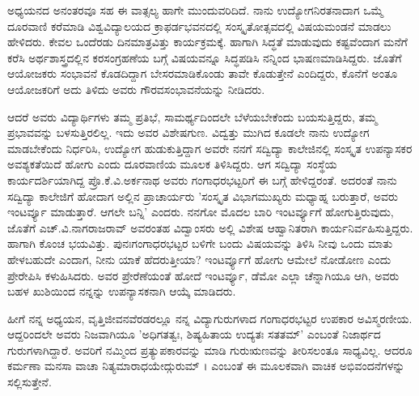 ಅಧ್ಯಯನದ ಅನಂತರವೂ ಸಹ ಈ ವಾತ್ಸಲ್ಯ ಹಾಗೇ ಮುಂದುವರಿದಿದೆ. ನಾನು ಉದ್ಯೋಗನಿರತನಾದಾಗ ಒಮ್ಮೆ ದೂರವಾಣಿ ಕರೆಮಾಡಿ ವಿಶ್ವವಿದ್ಯಾಲಯದ ಕ್ರಾಫರ್ಡಭವನದಲ್ಲಿ ಸಂಸ್ಕೃತೋತ್ಸವದಲ್ಲಿ ವಿಷಯಮಂಡನೆ ಮಾಡಲು ಹೇಳಿದರು. ಕೇವಲ ಒಂದೆರಡು ದಿನಮಾತ್ರವಿತ್ತು ಕಾರ್ಯಕ್ರಮಕ್ಕೆ. ಹಾಗಾಗಿ ಸಿದ್ಧತೆ ಮಾಡುವುದು ಕಷ್ಟವೆಂದಾಗ ಮನೆಗೆ ಕರೆಸಿ ಅರ್ಥಶಾಸ್ತ್ರದಲ್ಲಿನ ಕರಸಂಗ್ರಹಣೆಯ ಬಗ್ಗೆ ವಿಷಯವನ್ನೂ ಸಿದ್ಧಪಡಿಸಿ ನನ್ನಿಂದ ಭಾಷಣಮಾಡಿಸಿದ್ದರು. ಜೊತೆಗೆ ಆಯೋಜಕರು ಸಂಭಾವನೆ ಕೊಡದಿದ್ದಾಗ ಬೇಸರಮಾಡಿಕೊಂಡು ತಾವೇ ಕೊಡುತ್ತೇನೆ ಎಂದಿದ್ದರು, ಕೊನೆಗೆ ಅಂತೂ ಆಯೋಜಕರಿಗೆ ಅದು ತಿಳಿದು ಅವರು ಗೌರವಸಂಭಾವನೆಯನ್ನು ನೀಡಿದರು.

ಆದರೆ ಅವರು ವಿದ್ಯಾರ್ಥಿಗಳು ತಮ್ಮ ಪ್ರತಿಭೆ, ಸಾಮರ್ಥ್ಯದಿಂದಲೇ ಬೆಳೆಯಬೇಕೆಂದು ಬಯಸುತ್ತಿದ್ದರು, ತಮ್ಮ ಪ್ರಭಾವವನ್ನು ಬಳಸುತ್ತಿರಲಿಲ್ಲ. ಇದು ಅವರ ವಿಶೇಷಗುಣ. ವಿದ್ವತ್ತು ಮುಗಿದ ಕೂಡಲೇ ನಾನು ಉದ್ಯೋಗ ಮಾಡಬೇಕೆಂದು ನಿರ್ಧರಿಸಿ, ಉದ್ಯೋಗ ಹುಡುಕುತ್ತಿದ್ದಾಗ ಅವರೇ ನನಗೆ ಸದ್ವಿದ್ಯಾ ಕಾಲೇಜಿನಲ್ಲಿ ಸಂಸ್ಕೃತ ಉಪನ್ಯಾಸಕರ ಅವಶ್ಯಕತೆಯಿದೆ ಹೋಗು ಎಂದು ದೂರವಾಣಿಯ ಮೂಲಕ ತಿಳಿಸಿದ್ದರು. ಆಗ ಸದ್ವಿದ್ಯಾ ಸಂಸ್ಥೆಯ ಕಾರ್ಯದರ್ಶಿಯಾಗಿದ್ದ ಪ್ರೊ.ಕೆ.ವಿ.ಅರ್ಕನಾಥ ಅವರು ಗಂಗಾಧರಭಟ್ಟರಿಗೆ ಈ ಬಗ್ಗೆ ಹೇಳಿದ್ದರಂತೆ. ಅದರಂತೆ ನಾನು ಸದ್ವಿದ್ಯಾ ಕಾಲೇಜಿಗೆ ಹೋದಾಗ ಅಲ್ಲಿನ ಪ್ರಾಚಾರ್ಯರು ’ಸಂಸ್ಕೃತ ವಿಭಾಗಮುಖ್ಯರು ಮಧ್ಯಾಹ್ನ ಬರುತ್ತಾರೆ, ಅವರು ಇಂಟರ್ವ್ಯೂ ಮಾಡುತ್ತಾರೆ. ಆಗಲೇ ಬನ್ನಿ’ ಎಂದರು. ನನಗೋ ಮೊದಲ ಬಾರಿ ಇಂಟರ್ವ್ಯೂಗೆ ಹೋಗುತ್ತಿರುವುದು, ಜೊತೆಗೆ ಎಚ್.ವಿ.ನಾಗರಾಜರಾವ್ ಅವರಂತಹ ವಿದ್ವಾಂಸರು ಅಲ್ಲಿ ವಿಶೇಷ ಆಹ್ವಾನಿತರಾಗಿ ಕಾರ್ಯನಿರ್ವಹಿಸುತ್ತಿದ್ದರು. ಹಾಗಾಗಿ ಕೊಂಚ ಭಯವಿತ್ತು. ಪುನಃಗಂಗಾಧರಭಟ್ಟರ ಬಳಿಗೇ ಬಂದು ವಿಷಯವನ್ನು ತಿಳಿಸಿ ನೀವು ಒಂದು ಮಾತು ಹೇಳಬಹುದೇ ಎಂದಾಗ, ನೀನು ಯಾಕೆ ಹೆದರುತ್ತೀಯಾ? ಇಂಟರ್ವ್ಯೂಗೆ ಹೋಗು ಆಮೇಲೆ ನೋಡೋಣ ಎಂದು ಪ್ರೇರೇಪಿಸಿ ಕಳುಹಿಸಿದರು. ಅವರ ಪ್ರೇರೆಣೆಯಂತೆ ಹೋದೆ ಇಂಟರ್ವ್ಯೂ, ಡೆಮೋ ಎಲ್ಲಾ ಚೆನ್ನಾಗಿಯೂ ಆಗಿ, ಅವರು ಬಹಳ ಖುಶಿಯಿಂದ ನನ್ನನ್ನು ಉಪನ್ಯಾಸಕನಾಗಿ ಆಯ್ಕೆ ಮಾಡಿದರು.

ಹೀಗೆ ನನ್ನ ಅಧ್ಯಯನ, ವೃತ್ತಿಜೀವನವೆರಡರಲ್ಲೂ ನನ್ನ ವಿದ್ಯಾಗುರುಗಳಾದ ಗಂಗಾಧರಭಟ್ಟರ ಉಪಕಾರ ಅವಿಸ್ಮರಣೀಯ. ಆದ್ದರಿಂದಲೇ ಅವರು ನಿಜವಾಗಿಯೂ ’ಅಧಿಗತತ್ವಃ, ಶಿಷ್ಯಹಿತಾಯ ಉದ್ಯತಃ ಸತತಮ್’ ಎಂಬಂತೆ ನಿಜಾರ್ಥದ ಗುರುಗಳಾಗಿದ್ದಾರೆ. ಅವರಿಗೆ ನಮ್ಮಿಂದ ಪ್ರತ್ಯುಪಕಾರವನ್ನು ಮಾಡಿ ಗುರುಋಣವನ್ನು ತೀರಿಸಲಂತೂ ಸಾಧ್ಯವಿಲ್ಲ. ಆದರೂ ಕರ್ಮಣಾ ಮನಸಾ ವಾಚಾ ನಿತ್ಯಮಾರಾಧಯೇದ್ಗುರುಮ್ । ಎಂಬಂತೆ ಈ ಮೂಲಕವಾಗಿ ವಾಚಿಕ ಅಭಿವಂದನೆಗಳನ್ನು ಸಲ್ಲಿಸುತ್ತೇನೆ.

\articleend
